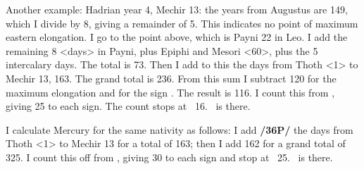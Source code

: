 Another example: Hadrian year 4, Mechir 13: the years from Augustus are 149, which I divide by 8, giving a remainder of 5. This indicates no point of maximum eastern elongation. I go to the point above, which is Payni 22 in Leo. I add the remaining 8 <days> in Payni, plus Epiphi and Mesori <60>, plus the
5 intercalary days. The total is 73. Then I add to this the days from Thoth <1> to Mechir 13, 163. The grand total is 236. From this sum I subtract 120 for the maximum elongation and for the sign \Leo. The result is 116. I count this from \Virgo, giving 25 to each sign. The count stops at \Capricorn\, 16\deg. \Venus\, is there.

I calculate Mercury for the same nativity as follows: I add \textbf{/36P/} the days from Thoth <1> to Mechir 13 for a total of 163; then I add 162 for a grand total of 325. I count this off from \Aries, giving 30 to each sign and stop at \Aquarius\, 25\deg. \Mercury\, is there.

\newpage